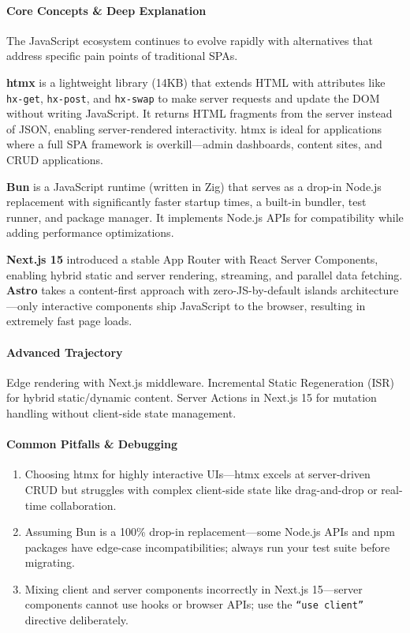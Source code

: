 \documentclass[11pt, a4paper, oneside]{report}
\begin{document}
\paragraph{Core Concepts \& Deep Explanation} The JavaScript ecosystem continues to evolve rapidly with alternatives that address specific pain points of traditional SPAs.

\textbf{htmx} is a lightweight library (14KB) that extends HTML with attributes like \texttt{hx-get}, \texttt{hx-post}, and \texttt{hx-swap} to make server requests and update the DOM without writing JavaScript. It returns HTML fragments from the server instead of JSON, enabling server-rendered interactivity. htmx is ideal for applications where a full SPA framework is overkill---admin dashboards, content sites, and CRUD applications.

\textbf{Bun} is a JavaScript runtime (written in Zig) that serves as a drop-in Node.js replacement with significantly faster startup times, a built-in bundler, test runner, and package manager. It implements Node.js APIs for compatibility while adding performance optimizations.

\textbf{Next.js 15} introduced a stable App Router with React Server Components, enabling hybrid static and server rendering, streaming, and parallel data fetching. \textbf{Astro} takes a content-first approach with zero-JS-by-default islands architecture---only interactive components ship JavaScript to the browser, resulting in extremely fast page loads.

\paragraph{Advanced Trajectory} Edge rendering with Next.js middleware. Incremental Static Regeneration (ISR) for hybrid static/dynamic content. Server Actions in Next.js 15 for mutation handling without client-side state management.

\paragraph{Common Pitfalls \& Debugging}
\begin{enumerate}[leftmargin=*]
\item Choosing htmx for highly interactive UIs---htmx excels at server-driven CRUD but struggles with complex client-side state like drag-and-drop or real-time collaboration.
\item Assuming Bun is a 100\% drop-in replacement---some Node.js APIs and npm packages have edge-case incompatibilities; always run your test suite before migrating.
\item Mixing client and server components incorrectly in Next.js 15---server components cannot use hooks or browser APIs; use the \texttt{``use client''} directive deliberately.
\end{enumerate}
\end{document}
